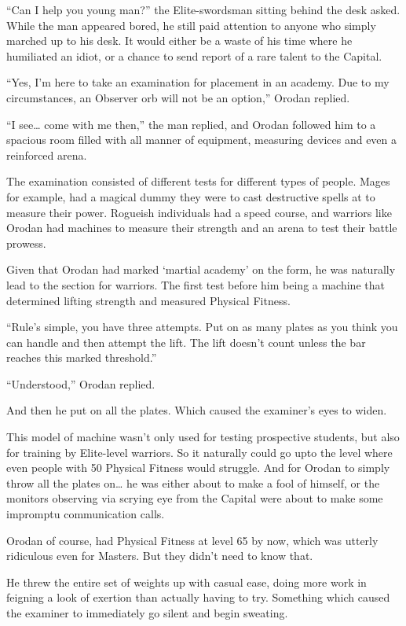 \documentclass[a4paper,10pt]{book}
\begin{document}
“Can I help you young man?” the Elite-swordsman sitting behind the desk asked. While the man appeared bored, he still paid attention to anyone who simply marched up to his desk. It would either be a waste of his time where he humiliated an idiot, or a chance to send report of a rare talent to the Capital.\par
“Yes, I’m here to take an examination for placement in an academy. Due to my circumstances, an Observer orb will not be an option,” Orodan replied.\par
“I see… come with me then,” the man replied, and Orodan followed him to a spacious room filled with all manner of equipment, measuring devices and even a reinforced arena.\par
The examination consisted of different tests for different types of people. Mages for example, had a magical dummy they were to cast destructive spells at to measure their power. Rogueish individuals had a speed course, and warriors like Orodan had machines to measure their strength and an arena to test their battle prowess.\par
Given that Orodan had marked ‘martial academy’ on the form, he was naturally lead to the section for warriors. The first test before him being a machine that determined lifting strength and measured Physical Fitness.\par
“Rule’s simple, you have three attempts. Put on as many plates as you think you can handle and then attempt the lift. The lift doesn’t count unless the bar reaches this marked threshold.”\par
“Understood,” Orodan replied.\par
And then he put on all the plates. Which caused the examiner’s eyes to widen.\par
This model of machine wasn’t only used for testing prospective students, but also for training by Elite-level warriors. So it naturally could go upto the level where even people with 50 Physical Fitness would struggle. And for Orodan to simply throw all the plates on… he was either about to make a fool of himself, or the monitors observing via scrying eye from the Capital were about to make some impromptu communication calls.\par
Orodan of course, had Physical Fitness at level 65 by now, which was utterly ridiculous even for Masters. But they didn’t need to know that.\par
He threw the entire set of weights up with casual ease, doing more work in feigning a look of exertion than actually having to try. Something which caused the examiner to immediately go silent and begin sweating.\par
\end{document}
